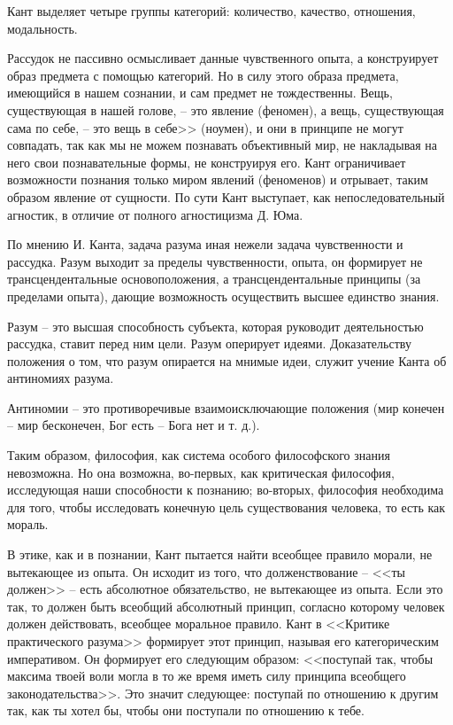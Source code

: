 \documentclass[12pt,a4paper]{article}
\begin{document}
	Кант выделяет четыре группы категорий: количество, качество, отношения, модальность.
	
	Рассудок не пассивно осмысливает данные чувственного опыта, а конструирует образ предмета с помощью категорий. Но в силу этого образа предмета, имеющийся в нашем сознании, и сам предмет не тождественны. Вещь, существующая в нашей голове, – это явление (феномен), а вещь, существующая сама по себе, – это вещь в себе>> (ноумен), и они в принципе не могут совпадать, так как мы не можем познавать объективный мир, не накладывая на него свои познавательные формы, не конструируя его. Кант ограничивает возможности познания только миром явлений (феноменов) и отрывает, таким образом явление от сущности. По сути Кант выступает, как непоследовательный агностик, в отличие от полного агностицизма Д. Юма.
	
	По мнению И. Канта, задача разума иная нежели задача чувственности и рассудка. Разум выходит за пределы чувственности, опыта, он формирует не трансцендентальные основоположения, а трансцендентальные принципы (за пределами опыта), дающие возможность осуществить высшее единство знания.
	
	Разум – это высшая способность субъекта, которая руководит деятельностью рассудка, ставит перед ним цели. Разум оперирует идеями. Доказательству положения о том, что разум опирается на мнимые идеи, служит учение Канта об антиномиях разума.
	
	Антиномии – это противоречивые взаимоисключающие положения (мир конечен – мир бесконечен, Бог есть – Бога нет и т. д.).
	
	Таким образом, философия, как система особого философского знания невозможна. Но она возможна, во-первых, как критическая философия, исследующая наши способности к познанию; во-вторых, философия необходима для того, чтобы исследовать конечную цель существования человека, то есть как мораль.
	
	В этике, как и в познании, Кант пытается найти всеобщее правило морали, не вытекающее из опыта. Он исходит из того, что долженствование – <<ты должен>> – есть абсолютное обязательство, не вытекающее из опыта. Если это так, то должен быть всеобщий абсолютный принцип, согласно которому человек должен действовать, всеобщее моральное правило. Кант в <<Критике практического разума>> формирует этот принцип, называя его категорическим императивом. Он формирует его следующим образом: <<поступай так, чтобы максима твоей воли могла в то же время иметь силу принципа всеобщего законодательства>>. Это значит следующее: поступай по отношению к другим так, как ты хотел бы, чтобы они поступали по отношению к тебе.
	
\end{document}
